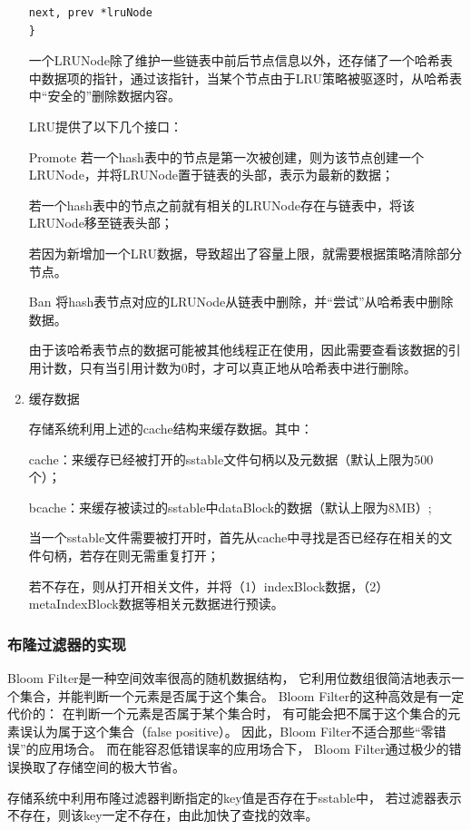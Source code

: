\begin{enumerate}
\begin{lstlisting}[caption=lruNode , label=code_radds_storage_lruNode]
	next, prev *lruNode
}
\end{lstlisting}

一个LRUNode除了维护一些链表中前后节点信息以外，还存储了一个哈希表中数据项的指针，通过该指针，当某个节点由于LRU策略被驱逐时，从哈希表中“安全的”删除数据内容。

LRU提供了以下几个接口：

Promote
若一个hash表中的节点是第一次被创建，则为该节点创建一个LRUNode，并将LRUNode置于链表的头部，表示为最新的数据；

若一个hash表中的节点之前就有相关的LRUNode存在与链表中，将该LRUNode移至链表头部；

若因为新增加一个LRU数据，导致超出了容量上限，就需要根据策略清除部分节点。

Ban
将hash表节点对应的LRUNode从链表中删除，并“尝试”从哈希表中删除数据。

由于该哈希表节点的数据可能被其他线程正在使用，因此需要查看该数据的引用计数，只有当引用计数为0时，才可以真正地从哈希表中进行删除。

		\item 缓存数据 
		
		存储系统利用上述的cache结构来缓存数据。其中：

cache：来缓存已经被打开的sstable文件句柄以及元数据（默认上限为500个）；

bcache：来缓存被读过的sstable中dataBlock的数据（默认上限为8MB）;

当一个sstable文件需要被打开时，首先从cache中寻找是否已经存在相关的文件句柄，若存在则无需重复打开；

若不存在，则从打开相关文件，并将（1）indexBlock数据，（2）metaIndexBlock数据等相关元数据进行预读。

		\end{enumerate}
		

		\subsubsection{布隆过滤器的实现}


		Bloom Filter是一种空间效率很高的随机数据结构，
		它利用位数组很简洁地表示一个集合，并能判断一个元素是否属于这个集合。
		Bloom Filter的这种高效是有一定代价的：
		在判断一个元素是否属于某个集合时，
		有可能会把不属于这个集合的元素误认为属于这个集合（false positive）。
		因此，Bloom Filter不适合那些“零错误”的应用场合。
		而在能容忍低错误率的应用场合下，
		Bloom Filter通过极少的错误换取了存储空间的极大节省。

存储系统中利用布隆过滤器判断指定的key值是否存在于sstable中，
若过滤器表示不存在，则该key一定不存在，由此加快了查找的效率。

